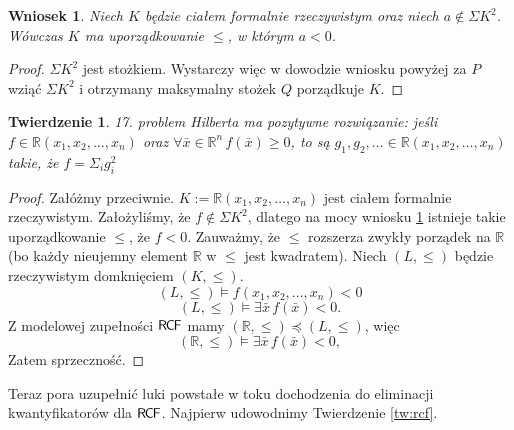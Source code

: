 \documentclass{article}
\newcommand{\R}{\mathbb{R}}
\theoremstyle{plain}
\newtheorem{tw}[thm]{Twierdzenie}
\newtheorem{wn}[thm]{Wniosek}
\theoremstyle{definition}
\theoremstyle{remark}
\newcommand{\RCF}{\mathsf{R \mkern-1.7mu C \mkern-1.4mu F}}
\begin{document}
\begin{wn}
	\label{wn:forrz}
	 Niech $K$ będzie ciałem formalnie rzeczywistym oraz niech $a \not \in \Sigma K^2$.
	 Wówczas $K$ ma uporządkowanie $\leq$, w którym $a < 0$.
\end{wn}
\begin{proof}
	 $\Sigma K^2$ jest stożkiem.
	 Wystarczy więc w dowodzie wniosku powyżej za $P$ wziąć $\Sigma K^2$ i otrzymany maksymalny stożek $Q$ porządkuje $K$.
\end{proof}

\begin{tw}
	 17. problem Hilberta ma pozytywne rozwiązanie:
	 jeśli $f \in \R(x_1, x_2, \ldots, x_n)$ oraz $\forall \bar{x} \in \R^n \, f(\bar{x}) \geq 0$,
	 to są $g_1, g_2, \ldots \in \R(x_1, x_2, \ldots, x_n)$ takie, że $f = \Sigma_i g_i^2$
\end{tw}
\begin{proof}
	 Załóżmy przeciwnie.
	 $K := \R(x_1, x_2, \ldots, x_n) $ jest ciałem formalnie rzeczywistym.
	 Założyliśmy, że $f \not \in \Sigma K^2$, dlatego na mocy wniosku \ref{wn:forrz} istnieje takie uporządkowanie $\leq$,
	 że $f < 0$.
	 Zauważmy, że $\leq$ rozszerza zwykły porządek na $\R$ (bo każdy nieujemny element $\R$ w $\leq$ jest kwadratem).
	 Niech $(L, \leq)$ będzie rzeczywistym domknięciem $(K, \leq)$.
	 \[
	 	 (L, \leq) \models f(x_1, x_2, \ldots, x_n ) < 0
	 \]
	 \[
	 	 (L, \leq) \models \exists \bar{x}  \, f(\bar{x}) < 0.
	 \]
	 Z modelowej zupełności $\RCF$ mamy $(\R, \leq) \preccurlyeq (L, \leq)$, więc
	 \[
	 	 (\R, \leq) \models  \exists \bar{x}  \, f(\bar{x}) < 0,
	 \]
Zatem sprzeczność.
\end{proof}


Teraz pora uzupełnić luki powstałe w toku dochodzenia do eliminacji
kwantyfikatorów dla $\RCF$. Najpierw udowodnimy Twierdzenie \ref{tw:rcf}.
\end{document}
